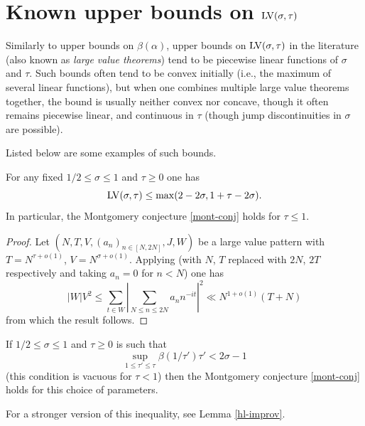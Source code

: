 \section{Known upper bounds on \texorpdfstring{$\mathrm{LV}(\sigma,\tau)$}{LV(sigma,tau)}}

Similarly to upper bounds on $\beta(\alpha)$, upper bounds on $\mathrm{LV}(\sigma,\tau)$ in the literature (also known as \emph{large value theorems}) tend to be piecewise linear functions of $\sigma$ and $\tau$.  Such bounds often tend to be convex initially (i.e., the maximum of several linear functions), but when one combines multiple large value theorems together, the bound is usually neither convex nor concave, though it often remains piecewise linear, and continuous in $\tau$ (though jump discontinuities in $\sigma$ are possible).

Listed below are some examples of such bounds.

\begin{theorem}\label{l2-mvt} For any fixed $1/2 \leq \sigma \leq 1$ and $\tau\geq 0$ one has
    $$ \mathrm{LV}(\sigma,\tau) \leq \max( 2-2\sigma, 1 + \tau - 2 \sigma).$$
In particular, the Montgomery conjecture \eqref{mont-conj} holds for $\tau \leq 1$.
\end{theorem}


\begin{proof}
Let $(N,T,V,(a_n)_{n \in [N,2N]},J,W)$ be a large value pattern with $T = N^{\tau + o(1)}$, $V = N^{\sigma + o(1)}$. Applying \cite[Theorem~9.4]{ik} (with $N$, $T$ replaced with $2N$, $2T$ respectively and taking $a_n = 0$ for $n < N$) one has
\[
|W|V^2 \le \sum_{t \in W} \left|\sum_{N \le n \le 2N} a_n n^{-it}\right|^2 \ll N^{1 + o(1)}(T + N)
\]
from which the result follows.
\end{proof}

\begin{theorem}\label{montgomery-lv} If $1/2 \leq \sigma \leq 1$ and $\tau \geq 0$ is such that
\begin{equation}\label{tab}
\sup_{1 \leq \tau' \leq \tau} \beta(1/\tau') \tau' < 2\sigma - 1
\end{equation}
(this condition is vacuous for $\tau < 1$) then the Montgomery conjecture \eqref{mont-conj} holds for this choice of parameters.
\end{theorem}

For a stronger version of this inequality, see Lemma \ref{hl-improv}.

